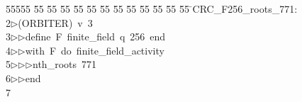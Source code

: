 %
%
\begin{tabbing}
55555 \= 55 \= 55 \= 55 \= 55 \= 55 \= 55 \= 55 \= 55 \= 55 \= 55 \= 55 \= 55 \= \>CRC\_F256\_roots\_771:\\[0pt]
2\>$\triangleright$\>(ORBITER)\ v\ 3\ \\[0pt]
3\>$\triangleright$\>$\triangleright$\>define\ F\ finite\_field\ q\ 256\ end\ \\[0pt]
4\>$\triangleright$\>$\triangleright$\>with\ F\ do\ finite\_field\_activity\ \\[0pt]
5\>$\triangleright$\>$\triangleright$\>$\triangleright$\>nth\_roots\ 771\ \\[0pt]
6\>$\triangleright$\>$\triangleright$\>end\\[0pt]
7\>\end{tabbing}
